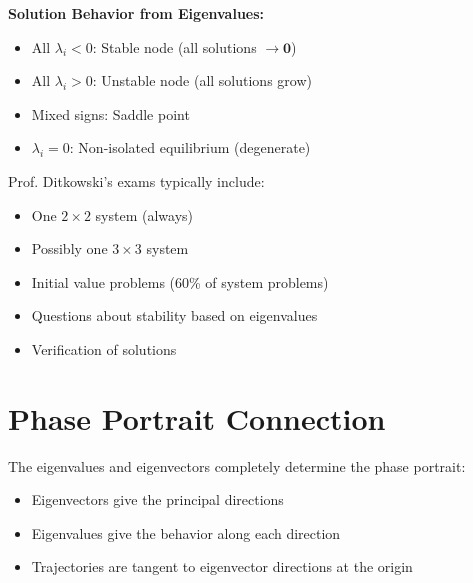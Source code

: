 \documentclass[12pt]{article}
\begin{document}
\begin{insight}
\textbf{Solution Behavior from Eigenvalues:}
\begin{itemize}
\item All $\lambda_{i} < 0$: Stable node (all solutions $\to \mathbf{0}$)
\item All $\lambda_{i} > 0$: Unstable node (all solutions grow)
\item Mixed signs: Saddle point
\item $\lambda_{i} = 0$: Non-isolated equilibrium (degenerate)
\end{itemize}
\end{insight}

\begin{examtip}
Prof. Ditkowski's exams typically include:
\begin{itemize}
\item One $2\times2$ system (always)
\item Possibly one $3\times3$ system
\item Initial value problems (60\% of system problems)
\item Questions about stability based on eigenvalues
\item Verification of solutions
\end{itemize}
\end{examtip}

\section{Phase Portrait Connection}

The eigenvalues and eigenvectors completely determine the phase portrait:
\begin{itemize}
\item Eigenvectors give the principal directions
\item Eigenvalues give the behavior along each direction
\item Trajectories are tangent to eigenvector directions at the origin
\end{itemize}

\end{document}
